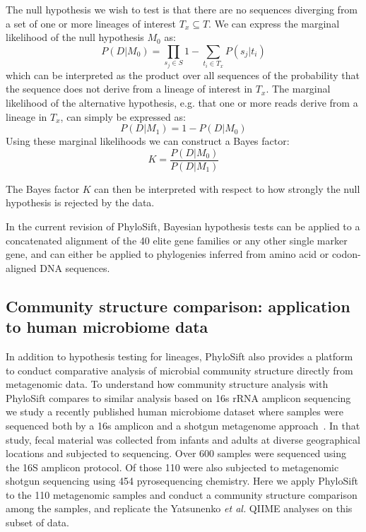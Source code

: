 \documentclass[10pt]{article}
\begin{document}
The null hypothesis we wish to test is that there are no sequences diverging from a set of one or more lineages of interest $T_x \subseteq T$.
We can express the marginal likelihood of the null hypothesis $M_0$ as:
\begin{equation}\label{eqn:null}
P(D|M_0) = \prod_{s_j \in S} 1 - \sum_{t_i \in T_x} P(s_j|t_i)
\end{equation}
which can be interpreted as the product over all sequences of the probability that the sequence does not derive from a lineage of interest in $T_x$.
The marginal likelihood of the alternative hypothesis, e.g. that one or more reads derive from a lineage in $T_x$, can simply be expressed as:
\begin{equation}\label{eqn:alt}
P(D|M_1) = 1-P(D|M_0)
\end{equation}
Using these marginal likelihoods we can construct a Bayes factor:
\begin{equation}\label{eqn:bayesfactor}
K=\frac{P(D|M_0)}{P(D|M_1)}
\end{equation}

The Bayes factor $K$ can then be interpreted with respect to how strongly the null hypothesis is rejected by the data.

In the current revision of PhyloSift, Bayesian hypothesis tests can be applied to a concatenated alignment of the 40 elite gene families or any other single marker gene, and can either be applied to phylogenies inferred from amino acid or codon-aligned {DNA} sequences.

\subsection*{Community structure comparison: application to human microbiome data}

In addition to hypothesis testing for lineages, PhyloSift also provides a platform to conduct comparative analysis of microbial community structure directly from metagenomic data.
To understand how community structure analysis with PhyloSift compares to similar analysis based on 16s rRNA amplicon sequencing we study a recently published human microbiome dataset where samples were sequenced both by a 16s amplicon and a shotgun metagenome approach~\cite{Yatsunenko2012}.
In that study, fecal material was collected from infants and adults at diverse geographical locations and subjected to sequencing.
Over 600 samples were sequenced using the 16S amplicon protocol.
Of those 110 were also subjected to metagenomic shotgun sequencing using 454 pyrosequencing chemistry.
Here we apply PhyloSift to the 110 metagenomic samples and conduct a community structure comparison among the samples, and replicate the Yatsunenko \textit{et al.} QIIME analyses on this subset of data.
\end{document}
